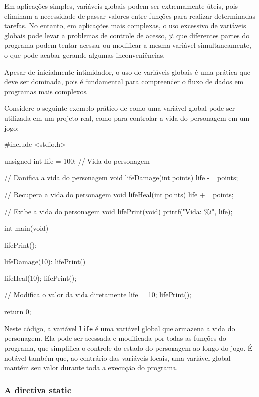 Em aplicações simples, variáveis globais podem ser extremamente úteis, pois 
eliminam a necessidade de passar valores entre funções para realizar 
determinadas tarefas. No entanto, em aplicações mais complexas, o uso 
excessivo de variáveis globais pode levar a problemas de controle de acesso, 
já que diferentes partes do programa podem tentar acessar ou modificar a mesma 
variável simultaneamente, o que pode acabar gerando algumas inconveniências.

Apesar de inicialmente intimidador, o uso de variáveis globais é uma prática 
que deve ser dominada, pois é fundamental para compreender o fluxo de dados 
em programas mais complexos.

Considere o seguinte exemplo prático de como uma variável global pode ser 
utilizada em um projeto real, como para controlar a vida do personagem em um 
jogo:

\newpage
\begin{excode}
    #include <stdio.h>

    unsigned int life = 100; // Vida do personagem

    // Danifica a vida do personagem
    void lifeDamage(int points) {
        life -= points;
    }

    // Recupera a vida do personagem
    void lifeHeal(int points) {
        life += points;
    }

    // Exibe a vida do personagem
    void lifePrint(void) {
        printf("Vida: \%i\n", life);
    }

    int main(void) {
        lifePrint();

        lifeDamage(10);
        lifePrint();

        lifeHeal(10);
        lifePrint();

        // Modifica o valor da vida diretamente
        life = 10;
        lifePrint();

        return 0;
    }
\end{excode}

Neste código, a variável \texttt{life} é uma variável global que armazena 
a vida do personagem. Ela pode ser acessada e modificada por todas as 
funções do programa, que simplifica o controle do estado do personagem ao 
longo do jogo. É notável também que, ao contrário das variáveis locais, uma 
variável global mantém seu valor durante toda a execução do programa.

\subsubsection{A diretiva static}

